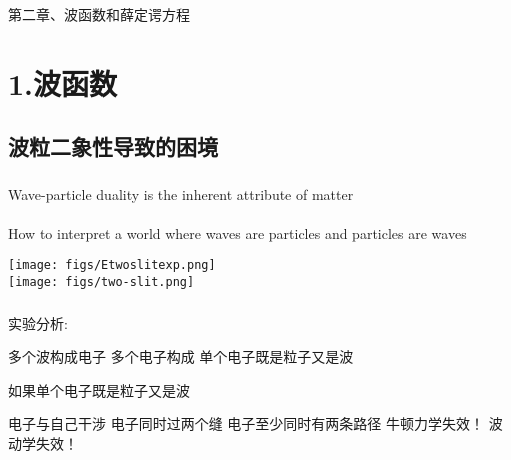 \begin{frame} [plain]
    \frametitle{}
    \Background[1] 
    \begin{center}
    { {\huge 第二章、波函数和薛定谔方程}}
    \end{center}  
    \addtocounter{framenumber}{-1}   
\end{frame}

\section{1.波函数}

\subsection{波粒二象性导致的困境}

\begin{frame}
    \frametitle{}
    \begin{tcolorbox4}[前情回顾]
        Wave-particle duality is the inherent attribute of matter\\
        ~~\\
        How to interpret a world where waves are particles and particles are waves
    \end{tcolorbox4}
\end{frame}

\begin{frame}
    \begin{center}
        \texttt{[image: figs/Etwoslitexp.png]} \\
        \texttt{[image: figs/two-slit.png]} \\
    \end{center} 
\end{frame}

\begin{frame}
    \frametitle{}
    实验分析:\\
    \begin{itemize}
        \Item 多个波构成电子 
        \Item 多个电子构成 
        \Item 单个电子既是粒子又是波 
    \end{itemize}
\end{frame}

\begin{frame}
    如果单个电子既是粒子又是波 \\
\begin{itemize}
    \Item  电子与自己干涉 
    \Item  电子同时过两个缝  
    \Item  电子至少同时有两条路径 
    \Item  牛顿力学失效！ 
    \Item  波动学失效！ 
\end{itemize}
\end{frame}

